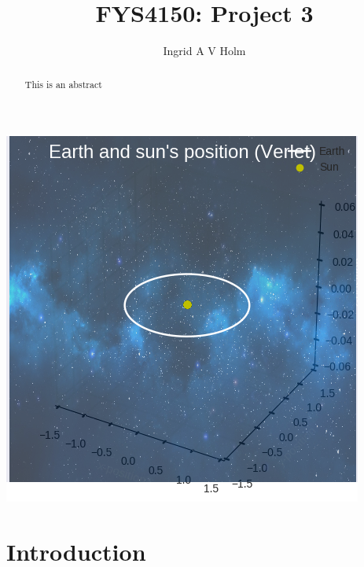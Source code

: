 \documentclass[11pt]{article}
\begin{document}
\title{FYS4150: Project 3}
\author{Ingrid A V Holm}
\maketitle

\begin{abstract}
This is an abstract
\end{abstract}


\begin{center}
\includegraphics[scale=0.6]{fig1_verlet_cool.png}
\end{center}

\pagebreak


\section{Introduction}
\end{document}

